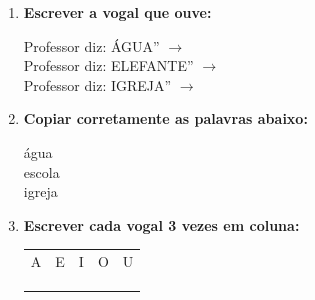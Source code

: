 \begin{exercicio}
\begin{enumerate}[resume]
  \item \textbf{Escrever a vogal que ouve:}
  \begin{center}
  Professor diz: ÁGUA'' $\rightarrow$ \underline{\hspace{1cm}} \\
  Professor diz: ELEFANTE'' $\rightarrow$ \underline{\hspace{1cm}} \\
  Professor diz: IGREJA'' $\rightarrow$ \underline{\hspace{1cm}}
  \end{center}

  \item \textbf{Copiar corretamente as palavras abaixo:}
  \begin{center}
  água \quad \underline{\hspace{3cm}} \\
  escola \quad \underline{\hspace{3cm}} \\
  igreja \quad \underline{\hspace{3cm}}
  \end{center}

  \item \textbf{Escrever cada vogal 3 vezes em coluna:}
  \begin{center}
  \begin{tabular}{ccccc}
  A & E & I & O & U \\
  \underline{\hspace{1cm}} & \underline{\hspace{1cm}} & \underline{\hspace{1cm}} & \underline{\hspace{1cm}} & \underline{\hspace{1cm}} \\
  \underline{\hspace{1cm}} & \underline{\hspace{1cm}} & \underline{\hspace{1cm}} & \underline{\hspace{1cm}} & \underline{\hspace{1cm}} \\
  \underline{\hspace{1cm}} & \underline{\hspace{1cm}} & \underline{\hspace{1cm}} & \underline{\hspace{1cm}} & \underline{\hspace{1cm}} \\
  \end{tabular}
  \end{center}
\end{enumerate}


\end{exercicio}
